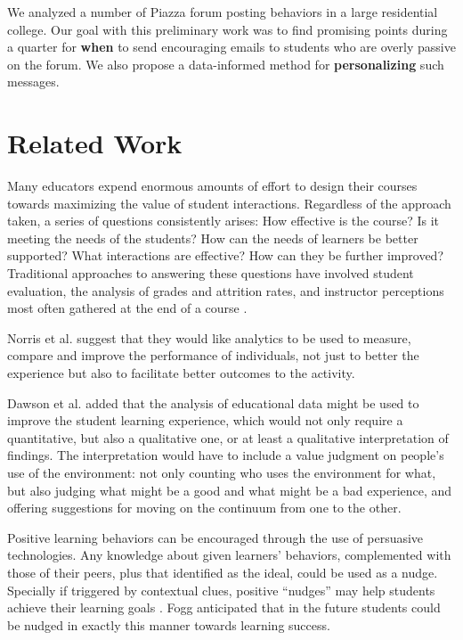 We analyzed a number of Piazza \cite{piazza} forum posting behaviors
in a large residential college. Our goal with this preliminary work
was to find promising points during a quarter for {\bf when} to send
encouraging emails to students who are overly passive on the forum. We
also propose a data-informed method for {\bf personalizing} such
messages.

\section{Related Work}
Many educators expend enormous amounts of effort to design their
courses towards maximizing the value of student
interactions. Regardless of the approach taken, a series of questions
consistently arises: How effective is the course? Is it meeting the
needs of the students? How can the needs of learners be better
supported? What interactions are effective? How can they be further
improved? Traditional approaches to answering these questions have
involved student evaluation, the analysis of grades and attrition
rates, and instructor perceptions most often gathered at the end of a
course \cite{tayl16_1}.

Norris et al. \cite{campbell2007academic} suggest that they would like
analytics to be used to measure, compare and improve the performance
of individuals, not just to better the experience but also to
facilitate better outcomes to the activity.

Dawson et al. \cite{doi} added that the analysis of educational data
might be used to improve the student learning experience, which would
not only require a quantitative, but also a qualitative one, or at
least a qualitative interpretation of findings. The interpretation
would have to include a value judgment on people's use of the
environment: not only counting who uses the environment for what, but
also judging what might be a good and what might be a bad experience,
and offering suggestions for moving on the continuum from one to the
other.

Positive learning behaviors can be encouraged through the use of
persuasive technologies. Any knowledge about given learners'
behaviors, complemented with those of their peers, plus that
identified as the ideal, could be used as a nudge. Specially if
triggered by contextual clues, positive ``nudges'' may help students
achieve their learning goals \cite{wilde2016understanding}. Fogg
\cite{Fogg} anticipated that in the future students could be nudged in
exactly this manner towards learning success.

